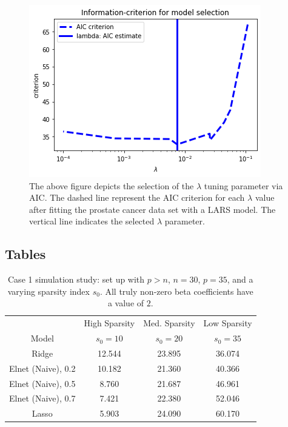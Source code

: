 \begin{figure}[H]
        \includegraphics[scale=0.7]{material/Img/AIC_plot.png}%
        \centering
        \caption[Selecting the $\lambda$ tuning parameter via AIC]{The above figure depicts the selection of the $\lambda$ tuning parameter via AIC. The dashed line represent the AIC criterion for each $\lambda$ value after fitting the prostate cancer data set with a LARS model. The vertical line indicates the selected $\lambda$ parameter.}
        \label{fig:AIC}
    \end{figure}

\subsection{Tables}\label{ap:tables}
\begin{table}[H]
\centering
\begin{tabular}{||c c c c||} 
 \hline
  & High Sparsity & Med. Sparsity & Low Sparsity \\ [0.5ex] 
  Model & $s_0=10$ & $s_0=20$ & $s_0=35$ \\ [0.5ex]
 \hline\hline
 Ridge & 12.544 & 23.895 & \cellcolor{pink!60}36.074\\ 
 \hline
 Elnet (Naive), 0.2 & 10.182 & \cellcolor{pink!60}21.360 & 40.366 \\
 \hline
 Elnet (Naive), 0.5 & 8.760 & 21.687 & 46.961\\
\hline
 Elnet (Naive), 0.7 & 7.421 & 22.380 & 52.046\\
\hline
 Lasso & \cellcolor{pink!60}5.903 & 24.090 & 60.170\\
\hline
\end{tabular}
\caption[Case 1 simulation study]{Case 1 simulation study: set up with $p>n$, $n=30$, $p=35$, and a varying sparsity index $s_{0}$. All truly non-zero beta coefficients have a value of $2$.}
\label{tab:case1}
\end{table}


